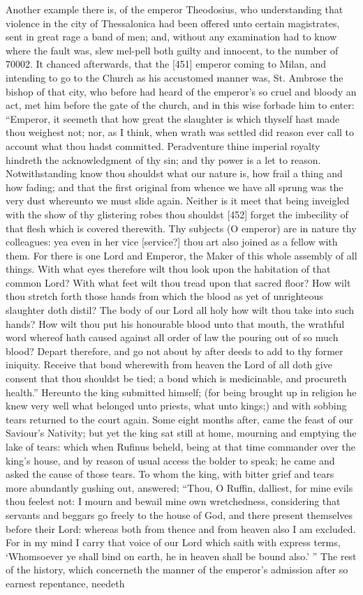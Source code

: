 Another example there is, of the emperor Theodosius, who understanding that violence in the city of Thessalonica had been offered unto certain magistrates, sent in great rage a band of men; and, without any examination had to know where the fault was, slew mel-pell both guilty and innocent, to the number of 70002. It chanced afterwards, that the [451] emperor coming to Milan, and intending to go to the Church as his accustomed manner was, St. Ambrose the bishop of that city, who before had heard of the emperor’s so cruel and bloody an act, met him before the gate of the church, and in this wise forbade him to enter: “Emperor, it seemeth that how great the slaughter is which thyself hast made thou weighest not; nor, as I think, when wrath was settled did reason ever call to account what thou hadst committed. Peradventure thine imperial royalty hindreth the acknowledgment of thy sin; and thy power is a let to reason. Notwithstanding know thou shouldst what our nature is, how frail a thing and how fading; and that the first original from whence we have all sprung was the very dust whereunto we must slide again. Neither is it meet that being inveigled with the show of thy glistering robes thou shouldst [452] forget the imbecility of that flesh which is covered therewith. Thy subjects (O emperor) are in nature thy colleagues: yea even in her vice [service?] thou art also joined as a fellow with them. For there is one Lord and Emperor, the Maker of this whole assembly of all things. With what eyes therefore wilt thou look upon the habitation of that common Lord? With what feet wilt thou tread upon that sacred floor? How wilt thou stretch forth those hands from which the blood as yet of unrighteous slaughter doth distil? The body of our Lord all holy how wilt thou take into such hands? How wilt thou put his honourable blood unto that mouth, the wrathful word whereof hath caused against all order of law the pouring out of so much blood? Depart therefore, and go not about by after deeds to add to thy former iniquity. Receive that bond wherewith from heaven the Lord of all doth give consent that thou shouldst be tied; a bond which is medicinable, and procureth health.” Hereunto the king submitted himself; (for being brought up in religion he knew very well what belonged unto priests, what unto kings;) and with sobbing tears returned to the court again. Some eight months after, came the feast of our Saviour’s Nativity; but yet the king sat still at home, mourning and emptying the lake of tears: which when Rufinus beheld, being at that time commander over the king’s house, and by reason of usual access the bolder to speak; he came and asked the cause of those tears. To whom the king, with bitter grief and tears more abundantly gushing out, answered; “Thou, O Ruffin, dalliest, for mine evils thou feelest not: I mourn and bewail mine own wretchedness, considering that servants and beggars go freely to the house of God, and there present themselves before their Lord: whereas both from thence and from heaven also I am excluded. For in my mind I carry that voice of our Lord which saith with express terms, ‘Whomsoever ye shall bind on earth, he in heaven shall be bound also.’ ” The rest of the history, which concerneth the manner of the emperor’s admission after so earnest repentance, needeth 